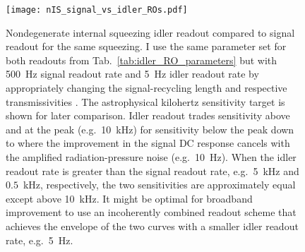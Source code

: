 \begin{figure}
    \centering
    \texttt{[image: nIS\_signal\_vs\_idler\_ROs.pdf]}
    \caption{  Nondegenerate internal squeezing idler readout compared to signal readout for the same squeezing. I use the same parameter set for both readouts from Tab.~\ref{tab:idler_RO_parameters} but with 500~Hz signal readout rate and 5~Hz idler readout rate by appropriately changing the signal-recycling length and respective transmissivities . The astrophysical kilohertz sensitivity target is shown for later comparison. Idler readout trades sensitivity above and at the peak (e.g.\ 10~kHz) for sensitivity below the peak down to where the improvement in the signal DC response cancels with the amplified radiation-pressure noise (e.g.\ 10~Hz). When the idler readout rate is greater than the signal readout rate, e.g.\ 5~kHz and $0.5$~kHz, respectively, the two sensitivities are approximately equal except above 10~kHz. It might be optimal for broadband improvement to use an incoherently combined readout scheme that achieves the envelope of the two curves with a smaller idler readout rate, e.g.\ 5~Hz.
    }
    \label{fig:nIS_signal_vs_idler_ROs}
\end{figure}

